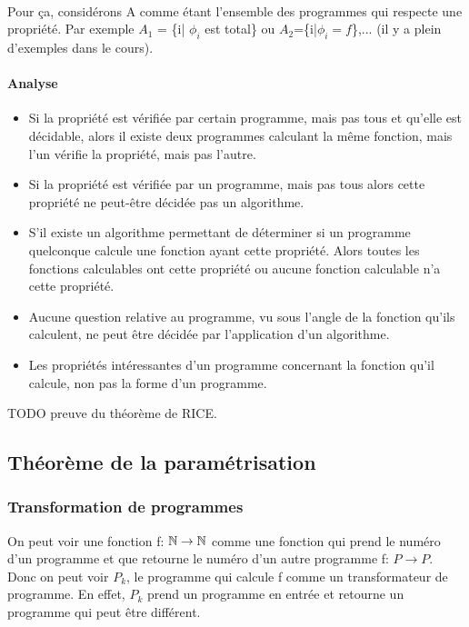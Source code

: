 \paragraph{}Pour ça, considérons A comme étant l'ensemble des programmes qui 
respecte une propriété. Par exemple $A_1$ = \{i| $\phi_i$ est total\} ou 
$A_2$=\{i|$\phi_i = f$\},... (il y a plein d'exemples dans le cours).

\paragraph{Analyse} 
\begin{itemize}
	\item Si la propriété est vérifiée par certain programme, mais pas tous 
		et qu'elle est décidable, alors il existe deux programmes calculant la 
		même fonction, mais l'un vérifie la propriété, mais pas l'autre.

	\item Si la propriété est vérifiée par un programme, mais pas tous 
		alors cette propriété ne peut-être décidée pas un algorithme.

	\item S'il existe un algorithme permettant de déterminer si un 
		programme quelconque calcule une fonction ayant cette propriété. 
		Alors toutes les fonctions calculables ont cette propriété ou 
		aucune fonction calculable n'a cette propriété.
	\item Aucune question relative au programme, vu sous l'angle de la 
		fonction qu'ils calculent, ne peut être décidée par 
		l'application d'un algorithme.
	\item Les propriétés intéressantes d'un programme concernant la 
		fonction qu'il calcule, non pas la forme d'un programme.
\end{itemize}

TODO preuve du théorème de RICE.



\subsection{Théorème de la paramétrisation}
\label{sub:th_or_me_de_la_param_trisation}

\subsubsection{Transformation de programmes}
\label{ssub:transformation_de_programmes}
\begin{mydef}
	On peut voir une fonction f: $\mathbb{N} \rightarrow \mathbb{N}$ comme une fonction qui prend 
	le numéro d'un programme et que retourne le numéro d'un autre programme f: $P 
	\rightarrow P$. Donc on peut voir $P_k$, le programme qui calcule f comme un 
	transformateur de programme. En effet, $P_k$ prend un programme en entrée et 
	retourne un programme qui peut être différent.
\end{mydef}

